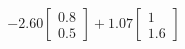 \documentclass[preview]{standalone}
\begin{document}
\begin{align*}
-2.60 \begin{bmatrix} 0.8 \\ 0.5 \end{bmatrix} + 1.07 \begin{bmatrix} 1 \\ 1.6 \end{bmatrix}
\end{align*}
\end{document}
